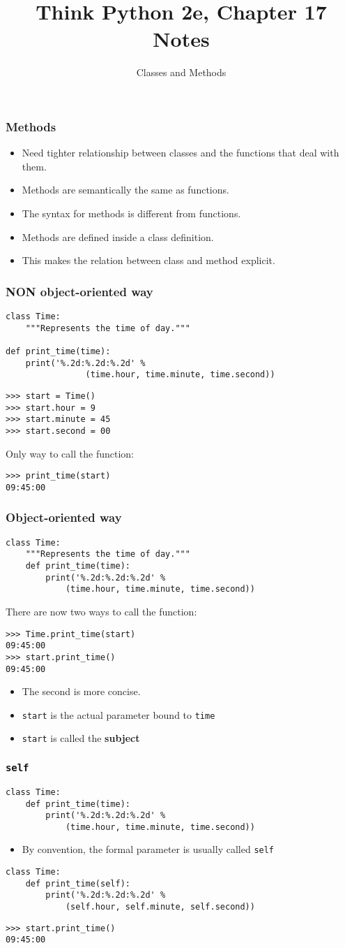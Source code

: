\documentclass{beamer}
\title{Think Python 2e, Chapter 17 Notes}
\author{Classes and Methods}
\newcommand{\bi}{\begin{itemize}}
\newcommand{\li}{\item}
\newcommand{\ei}{\end{itemize}}
\newcommand{\bfr}[1]{\begin{frame}[fragile]\frametitle{{ #1 }}}
\begin{document}
\begin{frame}
\maketitle
\end{frame}



\bfr{Methods}
\bi
\li
Need tighter relationship between classes and the functions
that deal with them.
\li Methods are semantically the same as functions.
\li The syntax for methods is different from functions.
\li Methods are defined inside a class definition.
\li This makes the relation between class and method explicit.
\ei
\end{frame}

\bfr{{\bf NON} object-oriented way}
\begin{lstlisting}
class Time:
    """Represents the time of day."""

def print_time(time):
    print('%.2d:%.2d:%.2d' % 
                (time.hour, time.minute, time.second))
\end{lstlisting}
\begin{lstlisting}
>>> start = Time()
>>> start.hour = 9
>>> start.minute = 45
>>> start.second = 00
\end{lstlisting}
Only way to call the function:
\begin{lstlisting}
>>> print_time(start)
09:45:00
\end{lstlisting}
\end{frame}

\bfr{Object-oriented way}
\begin{lstlisting}
class Time:
    """Represents the time of day."""
    def print_time(time):
        print('%.2d:%.2d:%.2d' % 
            (time.hour, time.minute, time.second))
\end{lstlisting}
There are now two ways to call the function:
\begin{lstlisting}
>>> Time.print_time(start)
09:45:00
>>> start.print_time()
09:45:00
\end{lstlisting}
\bi
\li The second is more concise.
\li \lstinline{start} is the actual parameter bound to \lstinline{time}
\li \lstinline{start} is called the {\bf subject}
\ei
\end{frame}

\bfr{\tt self}
\begin{lstlisting}
class Time:
    def print_time(time):
        print('%.2d:%.2d:%.2d' % 
            (time.hour, time.minute, time.second))
\end{lstlisting}
\bi
\li By convention, the formal parameter is usually called \lstinline{self}
\ei
\begin{lstlisting}
class Time:
    def print_time(self):
        print('%.2d:%.2d:%.2d' % 
            (self.hour, self.minute, self.second))
\end{lstlisting}
\begin{lstlisting}
>>> start.print_time()
09:45:00
\end{lstlisting}
\end{frame}
\end{document}
